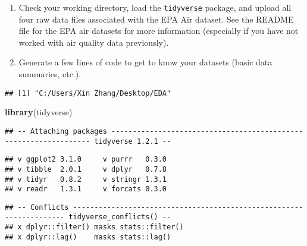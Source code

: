 \documentclass[]{article}
\newenvironment{Shaded}{\begin{snugshade}}{\end{snugshade}}
\newcommand{\KeywordTok}[1]{\textcolor[rgb]{0.13,0.29,0.53}{\textbf{#1}}}
\newcommand{\StringTok}[1]{\textcolor[rgb]{0.31,0.60,0.02}{#1}}
\newcommand{\CommentTok}[1]{\textcolor[rgb]{0.56,0.35,0.01}{\textit{#1}}}
\newcommand{\NormalTok}[1]{#1}
\begin{document}
\begin{enumerate}
\def\labelenumi{\arabic{enumi}.}
\item
  Check your working directory, load the \texttt{tidyverse} package, and
  upload all four raw data files associated with the EPA Air dataset.
  See the README file for the EPA air datasets for more information
  (especially if you have not worked with air quality data previously).
\item
  Generate a few lines of code to get to know your datasets (basic data
  summaries, etc.).
\end{enumerate}

\begin{Shaded}
\end{Shaded}

\begin{verbatim}
## [1] "C:/Users/Xin Zhang/Desktop/EDA"
\end{verbatim}

\begin{Shaded}
\begin{Highlighting}[]
\KeywordTok{library}\NormalTok{(tidyverse)}
\end{Highlighting}
\end{Shaded}

\begin{verbatim}
## -- Attaching packages ----------------------------------------------------------------- tidyverse 1.2.1 --
\end{verbatim}

\begin{verbatim}
## v ggplot2 3.1.0     v purrr   0.3.0
## v tibble  2.0.1     v dplyr   0.7.8
## v tidyr   0.8.2     v stringr 1.3.1
## v readr   1.3.1     v forcats 0.3.0
\end{verbatim}

\begin{verbatim}
## -- Conflicts -------------------------------------------------------------------- tidyverse_conflicts() --
## x dplyr::filter() masks stats::filter()
## x dplyr::lag()    masks stats::lag()
\end{verbatim}

\begin{Shaded}
\end{Shaded}
\end{document}
